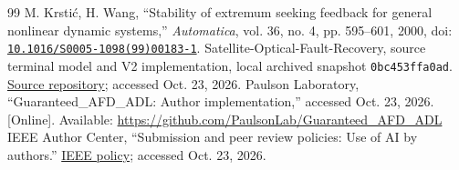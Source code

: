 \begin{thebibliography}{99}
 M. Krstić, H. Wang, ``Stability of extremum seeking feedback for general nonlinear dynamic systems,'' \emph{Automatica}, vol. 36, no. 4, pp. 595--601, 2000, doi: \href{https://doi.org/10.1016/S0005-1098(99)00183-1}{\nolinkurl{10.1016/S0005-1098(99)00183-1}}.
 Satellite-Optical-Fault-Recovery, source terminal model and V2 implementation, local archived snapshot \texttt{0bc453ffa0ad}. \href{https://github.com/kaushalrog/Satellite-Optical-Fault-Recovery}{Source repository}; accessed Oct. 23, 2026.
 Paulson Laboratory, ``Guaranteed\_AFD\_ADL: Author implementation,'' accessed Oct. 23, 2026. [Online]. Available: \url{https://github.com/PaulsonLab/Guaranteed_AFD_ADL}
 IEEE Author Center, ``Submission and peer review policies: Use of AI by authors.'' \href{https://journals.ieeeauthorcenter.ieee.org/become-an-ieee-journal-author/publishing-ethics/guidelines-and-policies/submission-and-peer-review-policies/}{IEEE policy}; accessed Oct. 23, 2026.
\end{thebibliography}
